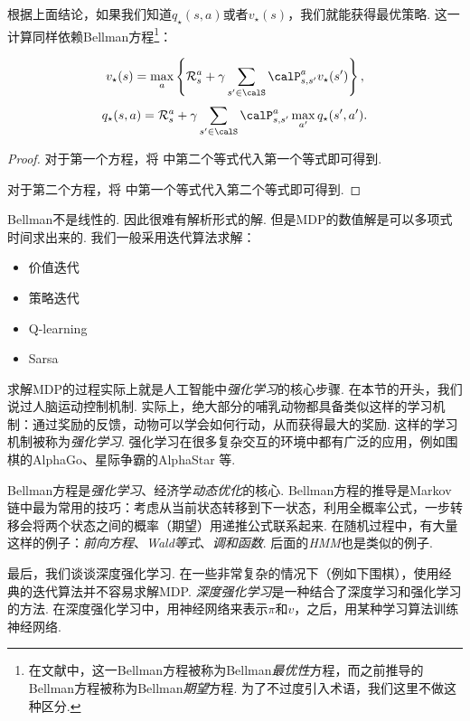 根据上面结论，如果我们知道$q_\star(s,a)$或者$v_\star(s)$，我们就能获得最优策略. 这一计算同样依赖Bellman方程\footnote{在文献中，这一Bellman方程被称为Bellman\emph{最优性}方程，而之前推导的Bellman方程被称为Bellman\emph{期望}方程. 为了不过度引入术语，我们这里不做这种区分. }：

\begin{theorem}[Bellman方程]
\[v_\star(s) = \max_a\left\{\mathcal R_s^a + \gamma \sum_{s'\in \calS}\calP_{s,s'}^av_\star(s')\right\},\]
\[q_\star(s,a) = \mathcal R_s^a+\gamma \sum_{s'\in \calS}\calP_{s,s'}^a\max_{a'}q_\star(s',a').\]
\end{theorem}
\begin{proof}
    对于第一个方程，将 中第二个等式代入第一个等式即可得到. 

    对于第二个方程，将 中第一个等式代入第二个等式即可得到. 
\end{proof}

Bellman不是线性的. 因此很难有解析形式的解. 但是MDP的数值解是可以多项式时间求出来的. 我们一般采用迭代算法求解：
\begin{itemize}
    \item 价值迭代
    \item 策略迭代
    \item Q-learning
    \item Sarsa
\end{itemize}

求解MDP的过程实际上就是人工智能中\emph{强化学习}的核心步骤. 在本节的开头，我们说过人脑运动控制机制. 实际上，绝大部分的哺乳动物都具备类似这样的学习机制：通过奖励的反馈，动物可以学会如何行动，从而获得最大的奖励. 这样的学习机制被称为\emph{强化学习}. 强化学习在很多复杂交互的环境中都有广泛的应用，例如围棋的AlphaGo、星际争霸的AlphaStar 等.

\begin{remark}
Bellman方程是\emph{强化学习}、经济学\emph{动态优化}的核心. Bellman方程的推导是Markov链中最为常用的技巧：考虑从当前状态转移到下一状态，利用全概率公式，一步转移会将两个状态之间的概率（期望）用递推公式联系起来. 在随机过程中，有大量这样的例子：\emph{前向方程}、\emph{Wald等式}、\emph{调和函数}. 后面的\emph{HMM}也是类似的例子.    
\end{remark}

最后，我们谈谈深度强化学习. 在一些非常复杂的情况下（例如下围棋），使用经典的迭代算法并不容易求解MDP. \emph{深度强化学习}是一种结合了深度学习和强化学习的方法. 在深度强化学习中，用神经网络来表示$\pi$和$v$，之后，用某种学习算法训练神经网络. 

